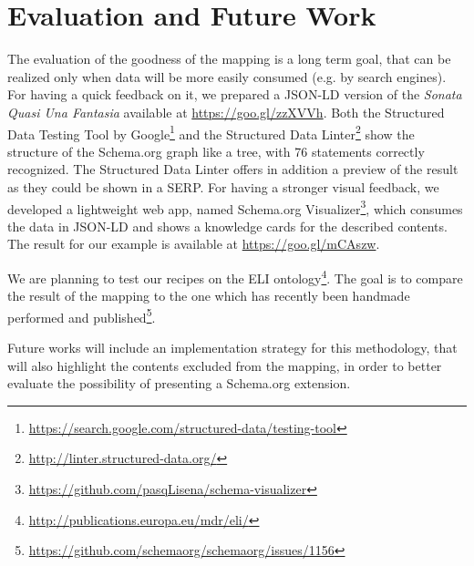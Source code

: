 \documentclass{llncs}
\begin{document}

\section{Evaluation and Future Work}
\label{sec:evaluation}

The evaluation of the goodness of the mapping is a long term goal, that can be realized only when data will be more easily consumed (e.g. by search engines). For having a quick feedback on it, we prepared a JSON-LD version of the \textit{Sonata Quasi Una Fantasia} available at \url{https://goo.gl/zzXVVh}.
Both the Structured Data Testing Tool by Google\footnote{\url{https://search.google.com/structured-data/testing-tool}} and the Structured Data Linter\footnote{\url{http://linter.structured-data.org/}} show the structure of the Schema.org graph like a tree, with 76 statements correctly recognized. The Structured Data Linter offers in addition a preview of the result as they could be shown in a SERP.
For having a stronger visual feedback, we developed a lightweight web app, named Schema.org Visualizer\footnote{\url{https://github.com/pasqLisena/schema-visualizer}}, which consumes the data in JSON-LD and shows a knowledge cards for the described contents. The result for our example is available at \url{https://goo.gl/mCAszw}.

We are planning to test our recipes on the ELI ontology\footnote{\url{http://publications.europa.eu/mdr/eli/}}. The goal is to compare the result of the mapping to the one which has recently been handmade performed and published\footnote{\url{https://github.com/schemaorg/schemaorg/issues/1156}}.

Future works will include an implementation strategy for this methodology, that will also highlight the contents excluded from the mapping, in order to better evaluate the possibility of presenting a Schema.org extension.



\end{document}
